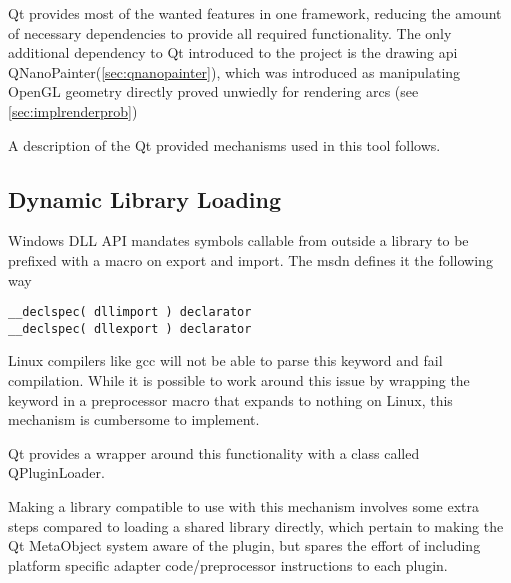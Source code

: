 Qt provides most of the wanted features in one framework, reducing the amount of necessary dependencies to provide all required functionality. The only additional dependency to Qt introduced to the project is the drawing \gls{api} QNanoPainter(\ref{sec:qnanopainter}), which was introduced as manipulating OpenGL geometry directly proved unwiedly for rendering arcs (see \ref{sec:implrenderprob})

A description of the Qt provided mechanisms used in this tool follows.

\subsection{Dynamic Library Loading}
Windows DLL API mandates symbols callable from outside a library to be prefixed with a macro on export and import. The \gls{msdn} defines it the following way
\begin{lstlisting}
__declspec( dllimport ) declarator  
__declspec( dllexport ) declarator  
\end{lstlisting}

Linux compilers like gcc will not be able to parse this keyword and fail compilation. While it is possible to work around this issue by wrapping the keyword in a preprocessor macro that expands to nothing on Linux, this mechanism is cumbersome to implement.

Qt provides a wrapper around this functionality with a class called QPluginLoader.

Making a library compatible to use with this mechanism involves some extra steps compared to loading a shared library directly, which pertain to making the Qt MetaObject system aware of the plugin, but spares the effort of including platform specific adapter code/preprocessor instructions to each plugin.

